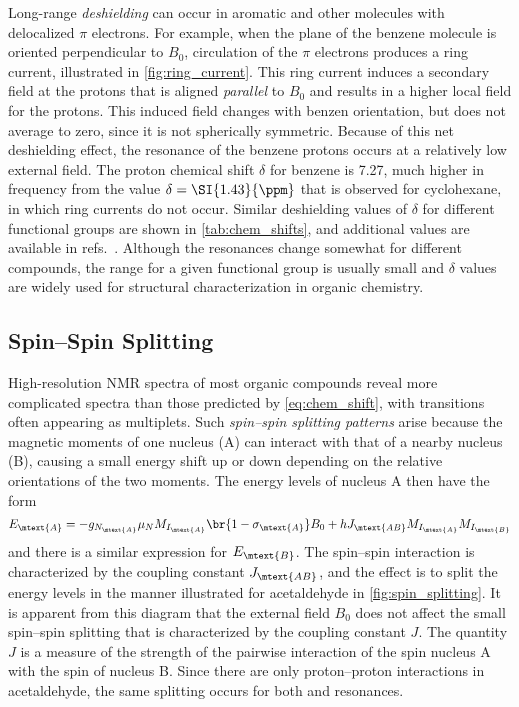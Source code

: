 \documentclass[nobib,nofonts,nols,nohyper,draft]{tufte-handout}
\begin{document}
Long-range \emph{deshielding} can occur in aromatic and other molecules with delocalized \( \pi \) electrons. 
For example, when the plane of the benzene molecule is oriented perpendicular to \( B_0 \), circulation of the \( \pi \) electrons produces a ring current, illustrated in \cref{fig:ring_current}. 
This ring current induces a secondary field at the protons that is aligned \emph{parallel} to \( B_0 \) and results in a higher local field for the protons. 
This induced field changes with benzen orientation, but does not average to zero, since it is not spherically symmetric. 
Because of this net deshielding effect, the resonance of the benzene protons occurs at a relatively low external field. 
The proton chemical shift \( \delta  \) for benzene is \SI{7.27}{\ppm}, much higher in frequency from the value \( \delta = \SI{1.43}{\ppm} \) that is observed for cyclohexane, in which ring currents do not occur. 
Similar deshielding values of \( \delta \) for different functional groups are shown in \cref{tab:chem_shifts}, and additional values are available in refs.~\autocite{davis1965advanced,pople1959nmr,silverstein2005spec,sdbs2020,aldrich1993nmr}.
Although the resonances change somewhat for different compounds, the range for a given functional group is usually small and \( \delta \) values are widely used for structural characterization in organic chemistry. 



\subsection{Spin--Spin Splitting} %
\label{sub:spin_spin_splitting}

High-resolution NMR spectra of most organic compounds reveal more complicated spectra than those predicted by \cref{eq:chem_shift}, with transitions often appearing as multiplets.
Such \emph{spin--spin splitting patterns} arise because the magnetic moments of one nucleus (A) can interact with that of a nearby nucleus (B), causing a small energy shift up or down depending on the relative orientations of the two moments. 
The energy levels of nucleus A then have the form 
\begin{equation}
	E_\mtext{A} = -g_{N_\mtext{A}} \mu_N M_{I_\mtext{A}} \br{1-\sigma_\mtext{A}} B_0
		+ h J_\mtext{AB} M_{I_\mtext{A}} M_{I_\mtext{B}}
	\label{eq:j_coupling}
\end{equation}
and there is a similar expression for \( E_\mtext{B} \). 
The spin--spin interaction is characterized by the coupling constant \( J_\mtext{AB} \), and the effect is to split the energy levels in the manner illustrated for acetaldehyde in \cref{fig:spin_splitting}. 
It is apparent from this diagram that the external field \( B_0 \) does not affect the small spin--spin splitting that is characterized by the coupling constant \( J \). 
The quantity \( J \) is a measure of the strength of the pairwise interaction of the spin nucleus A with the spin of nucleus B. 
Since there are only proton--proton interactions in acetaldehyde, the same splitting occurs for both  and  resonances. 
\end{document}

